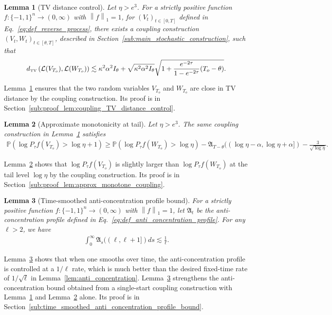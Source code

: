 \documentclass[11pt]{article}
\newcommand{\excess}{\alpha}
\newcommand{\fA}{\mathfrak{A}}
\newcommand{\btau}{\kappa}
\newcommand{\uV}{V}
\newcommand{\uW}{W}
\newcommand{\To}{{T_o}}
\theoremstyle{named}
\theoremstyle{plain}
\newtheorem{lemma}{Lemma}
\newcommand{\Prob}{\ensuremath{{\mathbb{P}}}}
\newcommand{\Law}{\mathcal{L}}
\newcommand{\tvdist}[2]{\ensuremath{ d_{\text{\tiny{TV}}}\parenth{#1, #2} }}
\newcommand{\parenth}[1]{\left( #1 \right)}
\newcommand{\vecnorm}[2]{\left\| #1\right\|_{#2}}
\begin{document}
\begin{lemma}[TV distance control]
  \label{lem:coupling_TV_distance_control}
  Let $\eta > e^3$. For a strictly positive function $f : \{-1,1\}^n \to (0,\infty)$ with $\vecnorm{f}{1} = 1$, for $(\uV_t)_{t \in [0, T]}$ defined in Eq.~\eqref{eq:def_reverse_process}, there exists a coupling construction $(\uV_t, \uW_t)_{t \in [\theta, T]}$, described in Section~\ref{sub:main_stochastic_construction}, such that
  \begin{align*}
    \tvdist{\Law(\uV_{\To})}{\Law(\uW_{\To})} \lesssim \btau^2 \excess^2 I_\theta + \sqrt{\btau^2 \excess^2 I_\theta} \sqrt{1 + \frac{e^{-2\tau}}{1-e^{-2\tau}} (\To - \theta)}.
  \end{align*}
\end{lemma}
Lemma~\ref{lem:coupling_TV_distance_control} ensures that the two random variables $\uV_{\To}$ and $\uW_{\To}$ are close in TV distance by the coupling construction. Its proof is in Section~\ref{sub:proof_lem:coupling_TV_distance_control}.


\begin{lemma}[Approximate monotonicity at tail]
  \label{lem:approx_monotone_coupling}
  Let $\eta > e^3$. The same coupling construction in Lemma~\ref{lem:coupling_TV_distance_control} satisfies
  \begin{align*}
    \Prob\parenth{\log P_{\tau}f(\uV_\To) > \log \eta + 1}
    \geq \Prob\parenth{\log P_\tau f(\uW_\To) > \log \eta}  - \fA_{T-\theta}((\log \eta - \excess, \log \eta + \excess]) - \frac{3}{\sqrt{\log \eta}}.
  \end{align*}
\end{lemma}
Lemma~\ref{lem:approx_monotone_coupling} shows that $\log P_\tau f(\uV_\To)$ is slightly larger than $\log P_\tau f(\uW_\To)$ at the tail level $\log \eta$ by the coupling construction. Its proof is in Section~\ref{sub:proof_lem:approx_monotone_coupling}.

\begin{lemma}[Time-smoothed anti-concentration profile bound]
  \label{lem:anticoncentration_profile_bound}
  For a strictly positive function $f : \{-1,1\}^n \to (0,\infty)$ with $\vecnorm{f}{1} = 1$, let $\fA_t$ be the anti-concentration profile defined in Eq.~\eqref{eq:def_anti_concentration_profile}. 
  For any $\ell > 2$, we have
  \begin{align*}
    \int_{0}^{\infty} \fA_s((\ell, \ell+1]) ds \lesssim \frac{1}{\ell}.
  \end{align*}
  
\end{lemma}
Lemma~\ref{lem:anticoncentration_profile_bound} shows that when one smooths over time, the anti-concentration profile is controlled at a $1/\ell$ rate, which is much better than the desired fixed-time rate of $1/\sqrt{\ell}$ in Lemma~\ref{lem:anti_concentration}. Lemma~\ref{lem:anticoncentration_profile_bound} strengthens the anti-concentration bound obtained from a single-start coupling construction with Lemma~\ref{lem:coupling_TV_distance_control} and Lemma~\ref{lem:approx_monotone_coupling} alone. Its proof is in Section~\ref{sub:time_smoothed_anti_concentration_profile_bound}.
\end{document}
